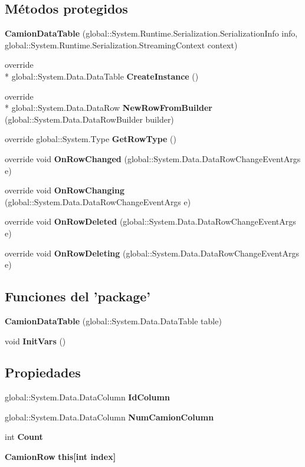 \subsection*{Métodos protegidos}
\begin{DoxyCompactItemize}
\item 
{\bf Camion\-Data\-Table} (global\-::\-System.\-Runtime.\-Serialization.\-Serialization\-Info info, global\-::\-System.\-Runtime.\-Serialization.\-Streaming\-Context context)
\item 
override \\*
global\-::\-System.\-Data.\-Data\-Table {\bf Create\-Instance} ()
\item 
override \\*
global\-::\-System.\-Data.\-Data\-Row {\bf New\-Row\-From\-Builder} (global\-::\-System.\-Data.\-Data\-Row\-Builder builder)
\item 
override global\-::\-System.\-Type {\bf Get\-Row\-Type} ()
\item 
override void {\bf On\-Row\-Changed} (global\-::\-System.\-Data.\-Data\-Row\-Change\-Event\-Args e)
\item 
override void {\bf On\-Row\-Changing} (global\-::\-System.\-Data.\-Data\-Row\-Change\-Event\-Args e)
\item 
override void {\bf On\-Row\-Deleted} (global\-::\-System.\-Data.\-Data\-Row\-Change\-Event\-Args e)
\item 
override void {\bf On\-Row\-Deleting} (global\-::\-System.\-Data.\-Data\-Row\-Change\-Event\-Args e)
\end{DoxyCompactItemize}
\subsection*{Funciones del 'package'}
\begin{DoxyCompactItemize}
\item 
{\bf Camion\-Data\-Table} (global\-::\-System.\-Data.\-Data\-Table table)
\item 
void {\bf Init\-Vars} ()
\end{DoxyCompactItemize}
\subsection*{Propiedades}
\begin{DoxyCompactItemize}
\item 
global\-::\-System.\-Data.\-Data\-Column {\bf Id\-Column}\hspace{0.3cm}{\ttfamily  [get]}
\item 
global\-::\-System.\-Data.\-Data\-Column {\bf Num\-Camion\-Column}\hspace{0.3cm}{\ttfamily  [get]}
\item 
int {\bf Count}\hspace{0.3cm}{\ttfamily  [get]}
\item 
{\bf Camion\-Row} {\bf this[int index]}\hspace{0.3cm}{\ttfamily  [get]}
\end{DoxyCompactItemize}

